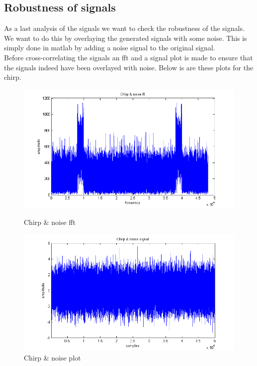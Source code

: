 \subsection{Robustness of signals}
As a last analysis of the signals we want to check the robustness of the signals. We want to do this by overlaying the generated signals with some noise. This is simply done in matlab by adding a noise signal to the original signal.\\
Before cross-correlating the signals an fft and a signal plot is made to ensure that the signals indeed have been overlayed with noise. Below is are these plots for the chirp.
\begin{figure}[H]
\begin{minipage}[b]{0.49\linewidth}
\centering
\includegraphics[width=1\textwidth]{billeder/chirp_noise_fft}
\caption{Chirp \& noise fft}
\label{fig:figure1}
\end{minipage}
\hspace{0.5cm}
\begin{minipage}[b]{0.49\linewidth}
\centering
\includegraphics[width=1\textwidth]{billeder/chirp_noise_signal}
\caption{Chirp \& noise plot}
\label{fig:figure2}
\end{minipage}
\end{figure}
